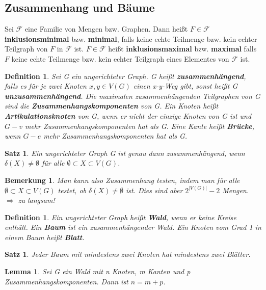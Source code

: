 \documentclass[12pt,a4paper]{article}
\theoremstyle{plain}
\newtheorem{Satz}[Theorem]{Satz}
\newtheorem{Lemma}[Theorem]{Lemma}
\newtheorem{Definition}[Theorem]{Definition}
\newtheorem{Bemerkung}[Theorem]{Bemerkung}
\newcommand{\herv}[1]{{\emph{\textbf{#1}}}}
\numberwithin{equation}{section}
\begin{document}
\subsection{Zusammenhang und Bäume}
Sei $\mathcal{F}$ eine Familie von Mengen bzw. Graphen. Dann heißt $F\in \mathcal{F}$ \textbf{inklusionsminimal} bzw. \textbf{minimal}, falls keine echte Teilmenge bzw. kein echter Teilgraph von $F$ in $\mathcal{F}$ ist. $F\in \mathcal{F}$ heißt \textbf{inklusionsmaximal} bzw. \textbf{maximal} falls $F$ keine echte Teilmenge bzw. kein echter Teilgraph eines Elementes von $\mathcal{F}$ ist.
\begin{Definition}
Sei G ein ungerichteter Graph. G heißt \herv{zusammenhängend}, falls es für je zwei Knoten $x,y\in V(G)$ einen x-y-Weg gibt, sonst heißt G \herv{unzusammenhängend}. Die maximalen zusammenhängenden Teilgraphen von G sind die \herv{Zusammenhangskomponenten} von G. Ein Knoten heißt \herv{Artikulationsknoten} von G, wenn er nicht der einzige Knoten von G ist und $G-v$ mehr Zusammenhangskomponenten hat als G. Eine Kante heißt \herv{Brücke}, wenn $G-e$ mehr Zusammenhangskomponenten hat als G.
\end{Definition}
\begin{Satz}
Ein ungerichteter Graph G ist genau dann zusammenhängend, wenn $\delta(X)\neq \emptyset$ für alle $\emptyset \subset X \subset V(G)$.
\end{Satz}
\begin{Bemerkung}
Man kann also Zusammenhang testen, indem man für alle $\emptyset \subset X \subset V(G)$ testet, ob $\delta(X)\neq \emptyset$ ist. Dies sind aber $2^{|V(G)|}-2$ Mengen. $\Rightarrow$ zu langsam!
\end{Bemerkung}
\begin{Definition}
Ein ungerichteter Graph heißt \herv{Wald}, wenn er keine Kreise enthält. Ein \herv{Baum} ist ein zusammenhängender Wald. Ein Knoten vom Grad 1 in einem Baum heißt \herv{Blatt}.
\end{Definition}
\begin{Satz}
Jeder Baum mit mindestens zwei Knoten hat mindestens zwei Blätter.
\end{Satz}
\begin{Lemma}
Sei G ein Wald mit n Knoten, m Kanten und p Zusammenhangskomponenten. Dann ist $n=m+p$.
\end{Lemma}
\end{document}
